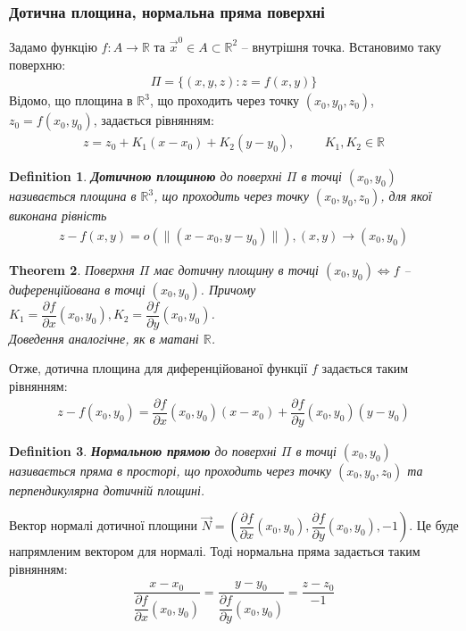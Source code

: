 \documentclass[a4paper, 10pt]{article}
\def\departial#1#2{\dfrac{\partial {#1}}{\partial {#2}}}
\theoremstyle{theoremdd}
\newtheorem{theorem}{Theorem}[subsection]
\theoremstyle{theoremdd}
\theoremstyle{theoremdd}
\newtheorem{definition}[theorem]{Definition}
\theoremstyle{theoremdd}
\theoremstyle{theoremdd}
\theoremstyle{theoremdd}
\theoremstyle{theoremdd}
\theoremstyle{theoremdd}
\theoremstyle{theoremdd}
\newcommand\Norm[1]{\|#1\|}
\begin{document}
\subsubsection{Дотична площина, нормальна пряма поверхні}
Задамо функцію $f\colon A \to \mathbb{R}$ та $\vec{x}^0 \in A \subset \mathbb{R}^2$ -- внутрішня точка. Встановимо таку поверхню:
\begin{align*}
\Pi = \{(x,y,z): z = f(x,y) \}
\end{align*}
Відомо, що площина в $\mathbb{R}^{3}$, що проходить через точку $(x_0, y_0, z_0)$, $z_0 = f(x_0,y_0)$, задається рівнянням:
\begin{align*}
z = z_0 + K_1(x-x_0) + K_2(y-y_0), \hspace{1cm} K_1,K_2 \in \mathbb{R}
\end{align*}

\begin{definition}
\textbf{Дотичною площиною} до поверхні $\Pi$ в точці $(x_0,y_0)$ називається площина в $\mathbb{R}^{3}$, що проходить через точку $(x_0,y_0,z_0)$, для якої виконана рівність
\begin{align*}
z - f(x,y) = o(\Norm{(x-x_0,y-y_0)}), (x,y) \to (x_0,y_0)
\end{align*}
\end{definition}

\begin{theorem}
Поверхня $\Pi$ має дотичну площину в точці $(x_0,y_0) \iff f$ -- диференційована в точці $(x_0,y_0)$. Причому $K_1 = \departial{f}{x}(x_0,y_0),K_2 = \departial{f}{y}(x_0,y_0)$.\\
\textit{Доведення аналогічне, як в матані $\mathbb{R}$.}
\end{theorem}

Отже, дотична площина для диференційованої функції $f$ задається таким рівнянням:
\begin{align*}
z - f(x_0,y_0) = \departial{f}{x}(x_0,y_0) (x-x_0) + \departial{f}{y}(x_0,y_0) (y-y_0)
\end{align*}

\begin{definition}
\textbf{Нормальною прямою} до поверхні $\Pi$ в точці $(x_0,y_0)$ називається пряма в просторі, що проходить через точку $(x_0,y_0,z_0)$ та перпендикулярна дотичній площині.
\end{definition}

Вектор нормалі дотичної площини $\vec{N} = \left( \departial{f}{x}(x_0,y_0), \departial{f}{y}(x_0,y_0), -1 \right)$. Це буде напрямленим вектором для нормалі. Тоді нормальна пряма задається таким рівнянням:
\begin{align*}
\dfrac{x-x_0}{\departial{f}{x}(x_0,y_0)} = \dfrac{y-y_0}{\departial{f}{y}(x_0,y_0)} = \dfrac{z-z_0}{-1}
\end{align*}
\end{document}
